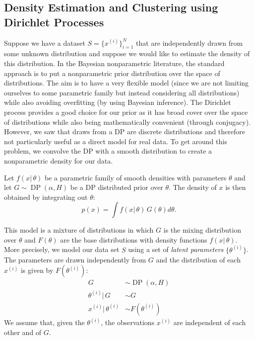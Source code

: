 \documentclass[final,3p,times,twocolumn]{elsarticle}
\DeclareMathOperator*{\DP}{DP}
\begin{document}
\subsection{Density Estimation and Clustering using Dirichlet Processes}
Suppose we have a dataset $S = \{x^{(i)}\}_{i=1}^N$ that are independently drawn from some unknown distribution and suppose we would like to estimate the density of this distribution.
In the Bayesian nonparametric literature, the standard approach is to put a nonparametric prior distribution over the space of distributions.
The aim is to have a very flexible model (since we are not limiting ourselves to some parametric family but instead considering all distributions) while also avoiding overfitting (by using Bayesian inference).
The Dirichlet process provides a good choice for our prior as it has broad cover over the space of distributions while also being mathematically convenient (through conjugacy).
However, we saw that draws from a DP are discrete distributions and therefore not particularly useful as a direct model for real data.
To get around this problem, we convolve the DP with a smooth distribution to create a nonparametric density for our data.

Let $f(x|\,\theta)$ be a parametric family of smooth densities with parameters $\theta$ and let $G \sim \DP(\alpha,H)$ be a DP distributed prior over $\theta$.
The density of $x$ is then obtained by integrating out $\theta$:
\begin{equation*}
p(x) = \int f(x|\,\theta)\, G(\theta)d\theta.
\end{equation*}

This model is a mixture of distributions in which $G$ is the mixing distribution over $\theta$ and $F(\theta)$ are the base distributions with density functions $f(x|\,\theta)$.
More precisely, we model our data set $S$ using a set of \emph{latent parameters} $\{\theta^{(i)}\}$.
The parameters are drawn independently from $G$ and the distribution of each $x^{(i)}$ is given by $F(\theta^{(i)})$:
\begin{equation}
\label{eqn:dpm}
\begin{split}
G &\sim \DP(\alpha,H)\\
\theta^{(i)} |\,G &\sim G\\
x^{(i)} |\,\theta^{(i)} &\sim F(\theta^{(i)})
\end{split}
\end{equation}
We assume that, given the $\theta^{(i)}$, the observations $x^{(i)}$ are independent of each other and of $G$.
\end{document}

